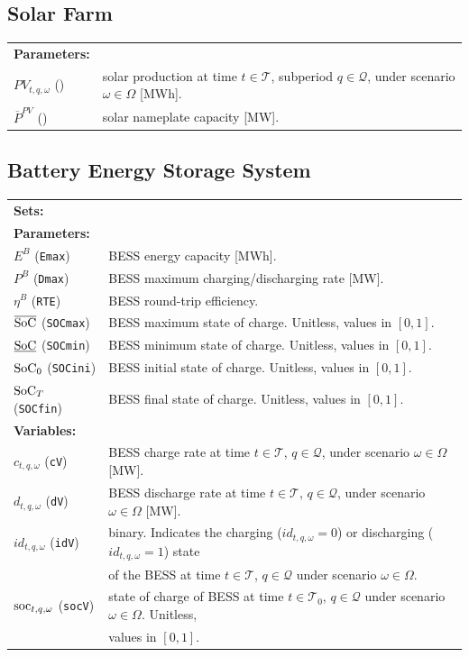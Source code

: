 \subsection{Solar Farm}
\label{SEC:SolarFarm2}

\begin{tabularx}{\textwidth}{l X}
    
    \textbf{Parameters:} \\
	$PV_{t,q, \omega}$ (\text{pPV}) & solar production at time $t \in \mathcal{T}$, subperiod $q \in \mathcal{Q}$, under scenario $\omega \in \Omega$ [MWh]. \\
	$\overline{P}^{PV}$ (\text{max\_pPV}) & solar nameplate capacity [MW]. \\
\end{tabularx}

\subsection{Battery Energy Storage System}
\label{SEC:BatteryEnergyStorageSystem2}

\begin{tabularx}{\textwidth}{l X}
\textbf{Sets:} \\[1mm]

\textbf{Parameters:} \\
$E^B$ (\texttt{Emax}) & BESS energy capacity [MWh]. \\
$P^B$ (\texttt{Dmax}) & BESS maximum charging/discharging rate [MW]. \\
$\eta^B$ (\texttt{RTE}) & BESS round-trip efficiency. \\
$\overline{\text{SoC}}$ (\texttt{SOCmax}) & BESS maximum state of charge. Unitless, values in $[0, 1]$. \\
$\underline{\text{SoC}}$ (\texttt{SOCmin}) & BESS minimum state of charge. Unitless, values in $[0, 1]$. \\
$\text{SoC}_0$ (\texttt{SOCini}) & BESS initial state of charge. Unitless, values in $[0, 1]$. \\
$\text{SoC}_T$ (\texttt{SOCfin}) & BESS final state of charge. Unitless, values in $[0, 1]$. \\[1mm]

\textbf{Variables:} \\
$c_{t,q, \omega}$ (\texttt{cV}) & BESS charge rate at time $t \in \mathcal{T}$, $q \in \mathcal{Q}$, under scenario $\omega \in \Omega$ [MW]. \\
$d_{t,q, \omega}$ (\texttt{dV}) & BESS discharge rate at time $t \in \mathcal{T}$, $q \in \mathcal{Q}$, under scenario $\omega \in \Omega$ [MW]. \\	
$id_{t,q, \omega}$ (\texttt{idV}) & binary. Indicates the charging ($id_{t,q, \omega} = 0$) or discharging ($id_{t,q, \omega} = 1$) state \\
& of the BESS at time $t \in \mathcal{T}$, $q \in \mathcal{Q}$ under scenario $\omega \in \Omega$. \\
$\text{soc}_{t,q, \omega}$ (\texttt{socV}) & state of charge of BESS at time $t \in \mathcal{T}_0$, $q \in \mathcal{Q}$ under scenario $\omega \in \Omega$. Unitless, \\
& values in $[0, 1]$. \\[1mm]
\end{tabularx}

